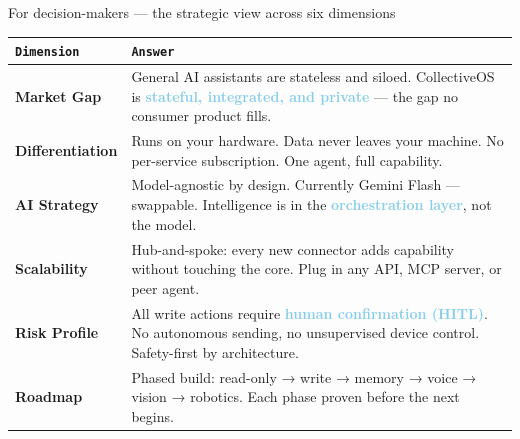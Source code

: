 \documentclass[aspectratio=169, 10pt]{beamer}
\newcommand{\hl}[1]{\textcolor{skyblue}{\textbf{#1}}}
\begin{document}
\begin{frame}{For decision-makers — the strategic view across six dimensions}
  \small
  \setlength{\tabcolsep}{8pt}
  \renewcommand{\arraystretch}{1.35}
  \begin{tabularx}{\textwidth}{>{\bfseries\color{skyblue}\small}p{3.0cm} X}
    \arrayrulecolor{accentcol!20}
    \toprule
    {\normalfont\color{dimcol}\texttt{Dimension}} &
    {\normalfont\color{dimcol}\texttt{Answer}} \\
    \midrule
    Market Gap &
      General AI assistants are stateless and siloed. CollectiveOS is \hl{stateful, integrated, and private} — the gap no consumer product fills. \\
    Differentiation &
      Runs on your hardware. Data never leaves your machine. No per-service subscription. One agent, full capability. \\
    AI Strategy &
      Model-agnostic by design. Currently Gemini Flash — swappable. Intelligence is in the \hl{orchestration layer}, not the model. \\
    Scalability &
      Hub-and-spoke: every new connector adds capability without touching the core. Plug in any API, MCP server, or peer agent. \\
    Risk Profile &
      All write actions require \hl{human confirmation (HITL)}. No autonomous sending, no unsupervised device control. Safety-first by architecture. \\
    Roadmap &
      Phased build: read-only → write → memory → voice → vision → robotics. Each phase proven before the next begins. \\
    \bottomrule
  \end{tabularx}
\end{frame}
\end{document}
